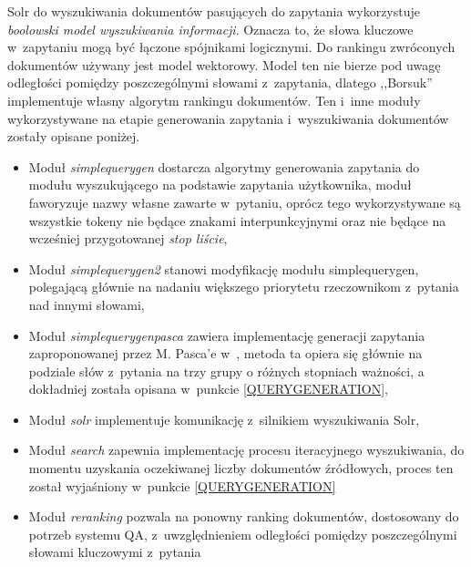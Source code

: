 \documentclass[a4paper, twoside, 12pt]{report}
\begin{document}
            Solr do wyszukiwania dokumentów pasujących do zapytania wykorzystuje \emph{boolowski model wyszukiwania informacji}.
            Oznacza to, że słowa kluczowe w~zapytaniu mogą być łączone spójnikami logicznymi. Do rankingu zwróconych
            dokumentów używany jest model wektorowy. Model ten nie bierze pod uwagę odległości pomiędzy poszczególnymi
            słowami z~zapytania, dlatego ,,Borsuk'' implementuje własny algorytm rankingu dokumentów. Ten i~inne moduły
            wykorzystywane na etapie generowania zapytania i~wyszukiwania dokumentów zostały opisane poniżej.
            \begin{itemize}
                \item Moduł \emph{simplequerygen} dostarcza algorytmy generowania zapytania do modułu wyszukującego
                    na podstawie zapytania użytkownika, moduł faworyzuje nazwy własne zawarte w~pytaniu, oprócz tego
                    wykorzystywane są wszystkie tokeny nie będące znakami interpunkcyjnymi oraz nie będące na wcześniej
                    przygotowanej \emph{stop liście},
                \item Moduł \emph{simplequerygen2} stanowi modyfikację modułu simplequerygen, polegającą głównie na
                    nadaniu większego priorytetu rzeczownikom z~pytania nad innymi słowami,
                \item Moduł \emph{simplequerygenpasca} zawiera implementację generacji zapytania zaproponowanej przez
                    M. Pasca'e w~\cite{PASZKA}, metoda ta opiera się głównie na podziale słów z~pytania na trzy grupy o różnych
                    stopniach ważności, a dokładniej została opisana w~punkcie \ref{QUERYGENERATION},
                \item Moduł \emph{solr} implementuje komunikację z~silnikiem wyszukiwania Solr,
                \item Moduł \emph{search} zapewnia implementację procesu iteracyjnego wyszukiwania, do momentu uzyskania
                    oczekiwanej liczby dokumentów źródłowych, proces ten został wyjaśniony w~punkcie \ref{QUERYGENERATION}
                \item Moduł \emph{reranking} pozwala na ponowny ranking dokumentów, dostosowany do potrzeb systemu QA,
                    z~uwzględnieniem odległości pomiędzy poszczególnymi słowami kluczowymi z~pytania
            \end{itemize}
\end{document}
